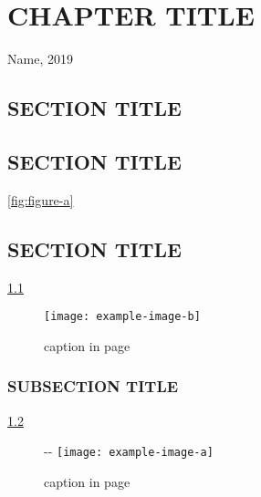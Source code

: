 \chapter{CHAPTER TITLE}
{Name, 2019}{}

\section{SECTION TITLE}
\citep{pereira19}
\blindtext

\section{SECTION TITLE}
\blindtext
\ref{fig:figure-a}


\section{SECTION TITLE}
\blindtext
\ref{fig:figure-b}

\begin{figure}[h!]
  \centering
  \texttt{[image: example-image-b]}
  \caption[caption in list of figure]{caption in page}
  \label{fig:figure-b}
\end{figure}

\subsection{SUBSECTION TITLE}
\blindtext
\ref{fig:figure-a-2}

\begin{figure}[!]
  \begin{addmargin*}[0pt]{-\marginparsep-\marginparwidth}
  \centering
  \texttt{[image: example-image-a]}
  \caption[caption in list of figure]{caption in page}
  \label{fig:figure-a-2}
  \end{addmargin*}
\end{figure}
